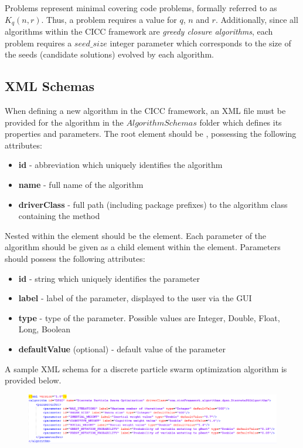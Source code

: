 \documentclass[titlepage]{article}
\begin{document}
Problems represent minimal covering code problems, formally referred to as $K_q(n,r)$. Thus, a problem requires a value for $q$, $n$ and $r$. Additionally, since all algorithms within the CICC framework are \textit{greedy closure algorithms}, each problem requires a $seed\_size$ integer parameter which corresponds to the size of the seeds (candidate solutions) evolved by each algorithm.

\subsection{XML Schemas}

When defining a new algorithm in the CICC framework, an XML file must be provided for the algorithm  in the $AlgorithmSchemas$ folder which defines its properties and parameters. The root element should be , possessing the following attributes:

\begin{itemize}
\item \textbf{id} - abbreviation which uniquely identifies the algorithm
\item \textbf{name} - full name of the algorithm
\item \textbf{driverClass} - full path (including package prefixes) to the algorithm class containing the  method
\end{itemize}

Nested within the  element should be the  element. Each parameter of the algorithm should be given as a  child element within the  element. Parameters should possess the following attributes:

\begin{itemize}
\item \textbf{id} - string which uniquely identifies the parameter
\item \textbf{label} - label of the parameter, displayed to the user via the GUI
\item \textbf{type} - type of the parameter. Possible values are {Integer, Double, Float, Long, Boolean}
\item \textbf{defaultValue} (optional) - default value of the parameter
\end{itemize}

A sample XML schema for a discrete particle swarm optimization algorithm is provided below.

\begin{figure}[H]
\centering
\includegraphics[width=180mm]{Images/SchemaExample.png}
\end{figure}
\end{document}
